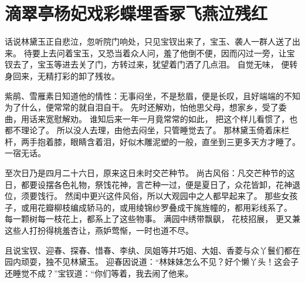 \chapter{滴翠亭杨妃戏彩蝶\quad 埋香冢飞燕泣残红}
\par
{}\par
话说林黛玉正自悲泣，忽听院门响处，只见宝钗出来了，宝玉、袭人一群人送了出来。
待要上去问着宝玉，又恐当着众人问，羞了他倒不便，因而闪过一旁，让宝钗去了，宝玉等进去关了门，方转过来，犹望着门洒了几点泪。
自觉无味，
便转身回来，无精打彩的卸了残妆。
\par
紫鹃、雪雁素日知道他的情性：无事闷坐，不是愁眉，便是长叹，且好端端的不知为了什么，便常常的就自泪自干。
先时还解劝，怕他思父母，想家乡，受了委曲，用话来宽慰解劝。
谁知后来一年一月竟常常的如此，
把这个样儿看惯了，也都不理论了。
所以没人去理，由他去闷坐，只管睡觉去了。
那林黛玉倚着床栏杆，两手抱着膝，眼睛含着泪，好似木雕泥塑的一般，直坐到三更多天方才睡了。
一宿无话。
\par
至次日乃是四月二十六日，原来这日未时交芒种节。
尚古风俗：凡交芒种节的这日，都要设摆各色礼物，祭饯花神，言芒种一过，便是夏日了，众花皆卸，花神退位，须要饯行。
然闺中更兴这件风俗，所以大观园中之人都早起来了。
那些女孩子，或用花瓣柳枝编成轿马的，或用绫锦纱罗叠成干旄旌幢的，都用彩线系了。
每一颗树每一枝花上，都系上了这些物事。
满园中绣带飘飖，
花枝招展， 更又兼这些人打扮得桃羞杏让，燕妒莺惭，一时也道不尽。
\par
且说宝钗、迎春、探春、惜春、李纨、凤姐等并巧姐、大姐、香菱与众丫鬟们都在园内顽耍，独不见林黛玉。
迎春因说道：“林妹妹怎么不见？好个懒丫头！这会子还睡觉不成？”宝钗道：“你们等着，我去闹了他来。
